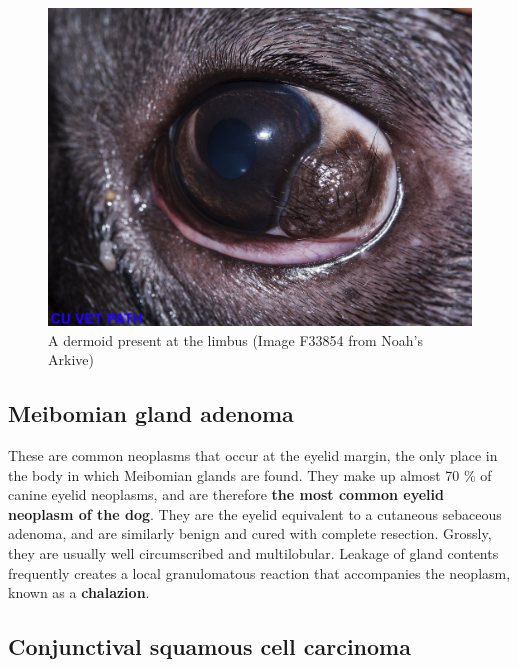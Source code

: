 \documentclass[
  openany]{article}
\begin{document}
\begin{figure}

{\centering \includegraphics{images/dermoid_F33854} 

}

\caption{A dermoid present at the limbus (Image F33854 from Noah's Arkive)}\label{fig:dermoid}
\end{figure}

\hypertarget{meibomian-gland-adenoma}{%
\subsection{Meibomian gland adenoma}\label{meibomian-gland-adenoma}}

These are common neoplasms that occur at the eyelid margin, the only place in the body in which Meibomian glands are found. They make up almost 70 \% of canine eyelid neoplasms, and are therefore \textbf{the most common eyelid neoplasm of the dog}. They are the eyelid equivalent to a cutaneous sebaceous adenoma, and are similarly benign and cured with complete resection. Grossly, they are usually well circumscribed and multilobular. Leakage of gland contents frequently creates a local granulomatous reaction that accompanies the neoplasm, known as a \textbf{chalazion}.

\hypertarget{conjunctival-squamous-cell-carcinoma}{%
\subsection{Conjunctival squamous cell carcinoma}\label{conjunctival-squamous-cell-carcinoma}}
\end{document}
